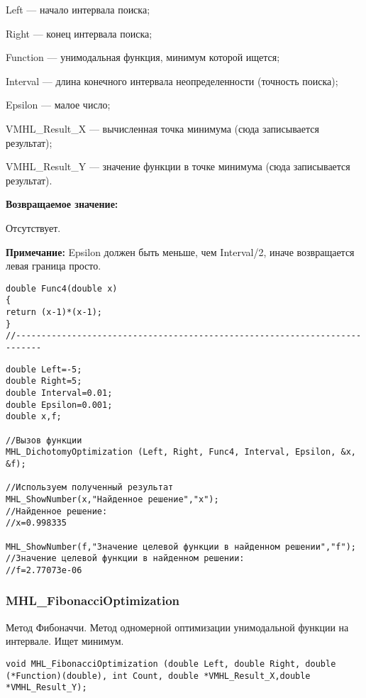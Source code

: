 \documentclass[a4paper,12pt]{article}
\begin{document}
 Left --- начало интервала поиска;
 
Right --- конец интервала поиска;
 
Function --- унимодальная функция, минимум которой ищется;
 
Interval --- длина конечного интервала неопределенности (точность поиска);
 
Epsilon --- малое число;
 
VMHL\_Result\_X --- вычисленная точка минимума (сюда записывается результат);
 
VMHL\_Result\_Y --- значение функции в точке минимума (сюда записывается результат).

\textbf{Возвращаемое значение:}
 
 Отсутствует.
 
\textbf{Примечание:}
 Epsilon должен быть меньше, чем Interval/2, иначе возвращается левая граница просто.

\begin{lstlisting}[caption=Оптимизируемая функция]
double Func4(double x)
{
return (x-1)*(x-1);
}
//---------------------------------------------------------------------------
\end{lstlisting}


\begin{lstlisting}[label=code_use_MHL_DichotomyOptimization,caption=Пример использования]
double Left=-5;
double Right=5;
double Interval=0.01;
double Epsilon=0.001;
double x,f;

//Вызов функции
MHL_DichotomyOptimization (Left, Right, Func4, Interval, Epsilon, &x, &f);

//Используем полученный результат
MHL_ShowNumber(x,"Найденное решение","x");
//Найденное решение:
//x=0.998335

MHL_ShowNumber(f,"Значение целевой функции в найденном решении","f");
//Значение целевой функции в найденном решении:
//f=2.77073e-06
\end{lstlisting}

\subsubsection{MHL\_FibonacciOptimization}\label{MHL_FibonacciOptimization}

Метод Фибоначчи. Метод одномерной оптимизации унимодальной функции на интервале. Ищет минимум.


\begin{lstlisting}[label=code_syntax_MHL_FibonacciOptimization,caption=Синтаксис]
void MHL_FibonacciOptimization (double Left, double Right, double (*Function)(double), int Count, double *VMHL_Result_X,double *VMHL_Result_Y);
\end{lstlisting}
\end{document}
